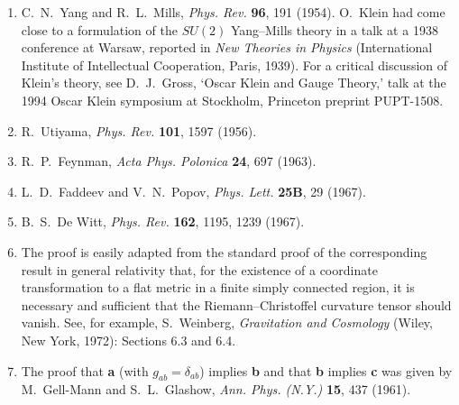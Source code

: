 


\begin{enumerate}
  \item {}\label{ch15-ref-1}
  C.~N.~Yang and R.~L.~Mills, \textit{Phys. Rev.} \textbf{96}, 191 (1954). O.~Klein had come close to a formulation of the $SU(2)$ Yang--Mills theory in a talk at a 1938 conference at Warsaw, reported in \textit{New Theories in Physics} (International Institute of Intellectual Cooperation, Paris, 1939). For a critical discussion of Klein's theory, see D.~J.~Gross, `Oscar Klein and Gauge Theory,' talk at the 1994 Oscar Klein symposium at Stockholm, Princeton preprint PUPT-1508.

  \item {}\label{ch15-ref-2}
  R.~Utiyama, \textit{Phys. Rev.} \textbf{101}, 1597 (1956).

  \item {}\label{ch15-ref-3}
  R.~P.~Feynman, \textit{Acta Phys. Polonica} \textbf{24}, 697 (1963).

  \item {}\label{ch15-ref-4}
  L.~D.~Faddeev and V.~N.~Popov, \textit{Phys. Lett.} \textbf{25B}, 29 (1967).

  \item {}\label{ch15-ref-5}
  B.~S.~De Witt, \textit{Phys. Rev.} \textbf{162}, 1195, 1239 (1967).

  \item {}\label{ch15-ref-6}
  The proof is easily adapted from the standard proof of the corresponding result in general relativity that, for the existence of a coordinate transformation to a flat metric in a finite simply connected region, it is necessary and sufficient that the Riemann--Christoffel curvature tensor should vanish. See, for example, S.~Weinberg, \textit{Gravitation and Cosmology} (Wiley, New York, 1972): Sections 6.3 and 6.4.

  \item {}\label{ch15-ref-7}
  The proof that \textbf{a} (with $g_{ab}=\delta_{ab}$) implies \textbf{b} and that \textbf{b} implies \textbf{c} was given by M.~Gell-Mann and S.~L.~Glashow, \textit{Ann. Phys. (N.Y.)} \textbf{15}, 437 (1961).


\end{enumerate}
